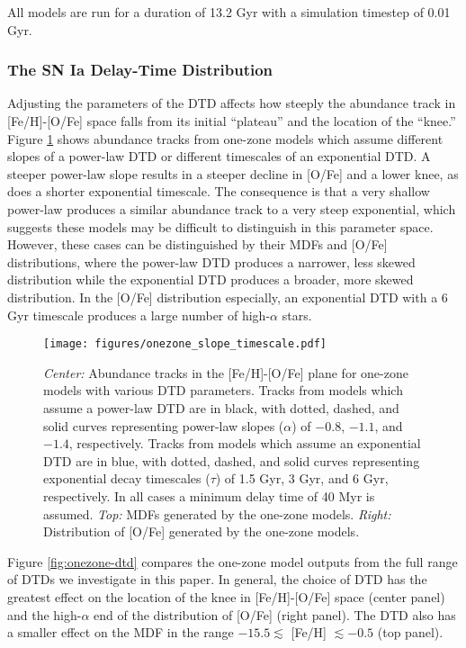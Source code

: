\documentclass[twocolumn]{aastex631}
\begin{document}
All models are run for a duration of 13.2 Gyr with a simulation timestep of 0.01 Gyr.

\subsubsection{The SN Ia Delay-Time Distribution}

Adjusting the parameters of the DTD affects how steeply the abundance track in [Fe/H]-[O/Fe] space falls from its initial ``plateau'' and the location of the ``knee.'' Figure \ref{fig:onezone-slope-timescale} shows abundance tracks from one-zone models which assume different slopes of a power-law DTD or different timescales of an exponential DTD. A steeper power-law slope results in a steeper decline in [O/Fe] and a lower knee, as does a shorter exponential timescale. The consequence is that a very shallow power-law produces a similar abundance track to a very steep exponential, which suggests these models may be difficult to distinguish in this parameter space. However, these cases can be distinguished by their MDFs and [O/Fe] distributions, where the power-law DTD produces a narrower, less skewed distribution while the exponential DTD produces a broader, more skewed distribution. In the [O/Fe] distribution especially, an exponential DTD with a 6 Gyr timescale produces a large number of high-$\alpha$ stars.

\begin{figure}
    \centering
    \texttt{[image: figures/onezone\_slope\_timescale.pdf]}
    \caption{\textit{Center:} Abundance tracks in the [Fe/H]-[O/Fe] plane for one-zone models with various DTD parameters. Tracks from models which assume a power-law DTD are in black, with dotted, dashed, and solid curves representing power-law slopes ($\alpha$) of $-0.8$, $-1.1$, and $-1.4$, respectively. Tracks from models which assume an exponential DTD are in blue, with dotted, dashed, and solid curves representing exponential decay timescales ($\tau$) of 1.5 Gyr, 3 Gyr, and 6 Gyr, respectively. In all cases a minimum delay time of 40 Myr is assumed. \textit{Top:} MDFs generated by the one-zone models. \textit{Right:} Distribution of [O/Fe] generated by the one-zone models.}
    \label{fig:onezone-slope-timescale}
\end{figure}

Figure \ref{fig:onezone-dtd} compares the one-zone model outputs from the full range of DTDs we investigate in this paper. In general, the choice of DTD has the greatest effect on the location of the knee in [Fe/H]-[O/Fe] space (center panel) and the high-$\alpha$ end of the distribution of [O/Fe] (right panel). The DTD also has a smaller effect on the MDF in the range $-15.5\lesssim$ [Fe/H] $\lesssim-0.5$ (top panel).
\end{document}
